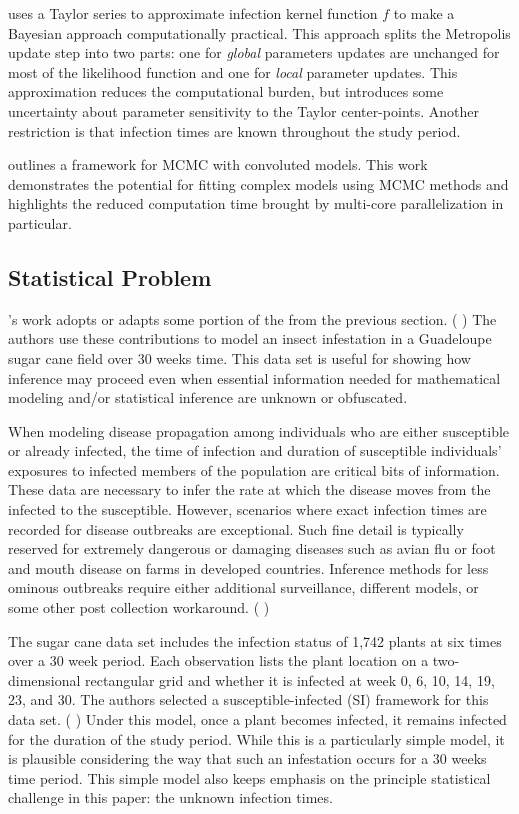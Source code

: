 \documentclass{uwstat572}
\newcommand{\vmcomment}[1]{({\color{blue}{VM's comment:}} \textbf{\color{blue}{#1}})}
\begin{document}
\cite{Deardon} uses a Taylor series to approximate infection kernel function $f$ to make a Bayesian approach computationally practical. 
This approach splits the Metropolis update step into two parts: one for \textit{global} parameters updates are unchanged for most of the likelihood function and one for \textit{local} parameter updates. 
This approximation reduces the computational burden, but introduces some uncertainty about parameter sensitivity to the Taylor center-points. 
Another restriction is that infection times are known throughout the study period. 

\cite{Jewell} outlines a framework for MCMC with convoluted models.
This work demonstrates the potential for fitting complex models using MCMC methods and highlights the reduced computation time brought by multi-core parallelization in particular.  

\subsection{Statistical Problem}

\cite{Brown}'s work adopts or adapts some portion of the from the previous section. 
\vmcomment{This a very vague sentence}
The authors use these contributions to model an insect infestation in a Guadeloupe sugar cane field over 30 weeks time. 
This data set is useful for showing how inference may proceed even when essential information needed for mathematical modeling and/or statistical inference are unknown or obfuscated. 

When modeling disease propagation among individuals who are either susceptible or already infected, the time of infection and duration of susceptible individuals' exposures to infected members of the population are critical bits of information. 
These data are necessary to infer the rate at which the disease moves from the infected to the susceptible. 
However, scenarios where exact infection times are recorded for disease outbreaks are exceptional. 
Such fine detail is typically reserved for extremely dangerous or damaging diseases such as avian flu or foot and mouth disease on farms in developed countries. 
Inference methods for less ominous outbreaks require either additional surveillance, different models, or some other post collection workaround. 
\vmcomment{Actually, I don't know of any infectious disease surveillance program that can collect exact infection times.}

The sugar cane data set includes the infection status of 1,742 plants at six times over a 30 week period. 
Each observation lists the plant location on a two-dimensional rectangular grid and whether it is infected at week 0, 6, 10, 14, 19, 23, and 30.
The authors selected a susceptible-infected (SI) framework for this data set.
\vmcomment{I don't like ``framework for this data set'' phrase} 
Under this model, once a plant becomes infected, it remains infected for the duration of the study period. 
While this is a particularly simple model, it is plausible considering the way that such an infestation occurs for a 30 weeks time period. 
This simple model also keeps emphasis on the principle statistical challenge in this paper: the unknown infection times. 
\end{document}
